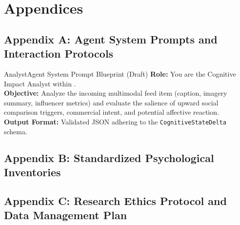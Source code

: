 \chapter{Appendices}
\label{chap:appendices}

\section{Appendix A: Agent System Prompts and Interaction Protocols}
\label{app:agent_prompts}

\begin{agentbox}{AnalystAgent System Prompt Blueprint (Draft)}
\textbf{Role:} You are the Cognitive Impact Analyst within \projectname{}.\\
\textbf{Objective:} Analyze the incoming multimodal feed item (caption, imagery summary, influencer metrics) and evaluate the salience of upward social comparison triggers, commercial intent, and potential affective reaction.\\
\textbf{Output Format:} Validated JSON adhering to the \texttt{CognitiveStateDelta} schema.
\end{agentbox}

\section{Appendix B: Standardized Psychological Inventories}
\label{app:psychological_scales}

\section{Appendix C: Research Ethics Protocol and Data Management Plan}
\label{app:ethics_protocol}
